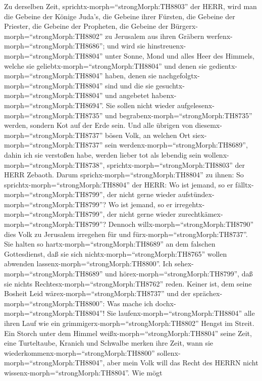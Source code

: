  Zu derselben Zeit, sprichtx-morph=``strongMorph:TH8803''
der HERR, wird man die Gebeine der Könige Juda's, die Gebeine ihrer
Fürsten, die Gebeine der Priester, die Gebeine der Propheten, die
Gebeine der Bürgerx-morph=``strongMorph:TH8802'' zu Jerusalem aus ihren
Gräbern werfenx-morph=``strongMorph:TH8686'';  und wird sie
hinstreuenx-morph=``strongMorph:TH8804'' unter Sonne, Mond und alles
Heer des Himmels, welche sie geliebtx-morph=``strongMorph:TH8804'' und
denen sie gedientx-morph=``strongMorph:TH8804'' haben, denen sie
nachgefolgtx-morph=``strongMorph:TH8804'' sind und die sie
gesuchtx-morph=``strongMorph:TH8804'' und angebetet
habenx-morph=``strongMorph:TH8694''. Sie sollen nicht wieder
aufgelesenx-morph=``strongMorph:TH8735'' und
begrabenx-morph=``strongMorph:TH8735'' werden, sondern Kot auf der Erde
sein.  Und alle übrigen von
diesemx-morph=``strongMorph:TH8737'' bösen Volk, an welchen Ort
siex-morph=``strongMorph:TH8737'' sein
werdenx-morph=``strongMorph:TH8689'', dahin ich sie verstoßen habe,
werden lieber tot als lebendig sein
wollenx-morph=``strongMorph:TH8738'',
sprichtx-morph=``strongMorph:TH8803'' der HERR Zebaoth. 
Darum sprichx-morph=``strongMorph:TH8804'' zu ihnen: So
sprichtx-morph=``strongMorph:TH8804'' der HERR: Wo ist jemand, so er
fälltx-morph=``strongMorph:TH8799'', der nicht gerne wieder
aufstündex-morph=``strongMorph:TH8799''? Wo ist jemand, so er
irregehtx-morph=``strongMorph:TH8799'', der nicht gerne wieder
zurechtkämex-morph=``strongMorph:TH8799''?  Dennoch
willx-morph=``strongMorph:TH8790'' dies Volk zu Jerusalem irregehen für
und fürx-morph=``strongMorph:TH8737''. Sie halten so
hartx-morph=``strongMorph:TH8689'' an dem falschen Gottesdienst, daß sie
sich nichtx-morph=``strongMorph:TH8765'' wollen abwenden
lassenx-morph=``strongMorph:TH8800''.  Ich
sehex-morph=``strongMorph:TH8689'' und
hörex-morph=``strongMorph:TH8799'', daß sie nichts
Rechtesx-morph=``strongMorph:TH8762'' reden. Keiner ist, dem seine
Bosheit Leid wärex-morph=``strongMorph:TH8737'' und der
sprächex-morph=``strongMorph:TH8800'': Was mache ich
dochx-morph=``strongMorph:TH8804''! Sie
laufenx-morph=``strongMorph:TH8804'' alle ihren Lauf wie ein
grimmigerx-morph=``strongMorph:TH8802'' Hengst im Streit. 
Ein Storch unter dem Himmel weißx-morph=``strongMorph:TH8804'' seine
Zeit, eine Turteltaube, Kranich und Schwalbe merken ihre Zeit, wann sie
wiederkommenx-morph=``strongMorph:TH8800''
sollenx-morph=``strongMorph:TH8804'', aber mein Volk will das Recht des
HERRN nicht wissenx-morph=``strongMorph:TH8804''.  Wie mögt
